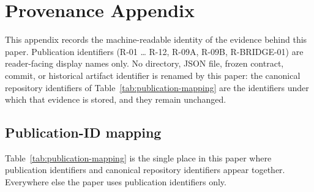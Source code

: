 \section{Provenance Appendix}
\label{sec:provenance-appendix}

This appendix records the machine-readable identity of the evidence behind
this paper. Publication identifiers (R-01 \ldots{} R-12, R-09A, R-09B,
R-BRIDGE-01) are reader-facing display names only. No directory, JSON file,
frozen contract, commit, or historical artifact identifier is renamed by
this paper: the canonical repository identifiers of
Table~\ref{tab:publication-mapping} are the identifiers under which that
evidence is stored, and they remain unchanged.

\subsection{Publication-ID mapping}
\label{sec:publication-mapping}

Table~\ref{tab:publication-mapping} is the single place in this paper where
publication identifiers and canonical repository identifiers appear
together. Everywhere else the paper uses publication identifiers only.


